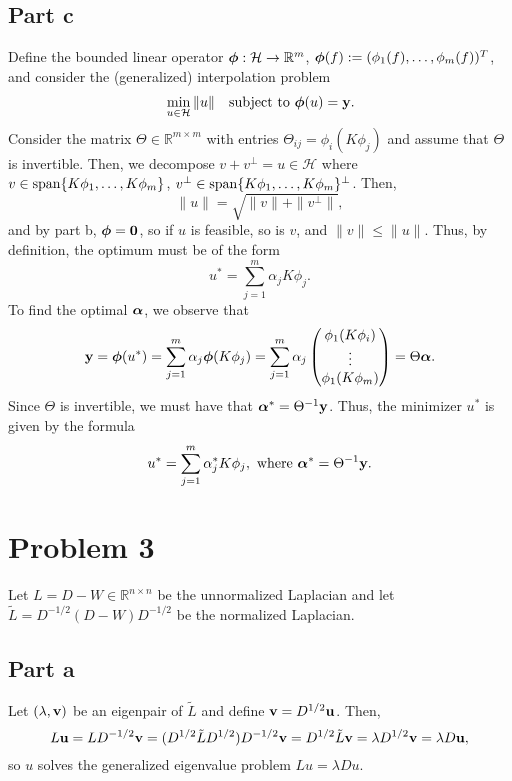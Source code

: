\documentclass{article}
\begin{document}
\subsection{Part c}
Define the bounded linear operator ${\boldsymbol{\phi}}: \mathcal{H} \rightarrow \mathbb{R}^m$, ${\boldsymbol{\phi}}(f) := (\phi_1(f), \dots, \phi_m(f))^T$, and consider the (generalized) interpolation problem
\begin{equation*}
	\begin{aligned}
		&\min_{u \in \mathcal{H}}\|u\|
		&\text{subject to } {\boldsymbol{\phi}}(u) = \mathbf{y}.
	\end{aligned}
\end{equation*}
Consider the matrix $\Theta \in \mathbb{R}^{m \times m}$ with entries $\Theta_{ij} = \phi_i(K\phi_j)$ and assume that $\Theta$ is invertible. Then, we decompose $v+v^\perp=u\in\mathcal{H}$ where $v\in\operatorname{span}\{K\phi_1, \dots, K\phi_m\}$, $v^\perp\in\operatorname{span}\{K\phi_1, \dots, K\phi_m\}^\perp$. Then, 
\[
\|u\|=\sqrt{\|v\|+\|v^\perp\|},
\]
and by part b, ${\boldsymbol{\phi}}=\mathbf{0}$, so if $u$ is feasible, so is $v$, and $\|v\|\leq\|u\|$. Thus, by definition, the optimum must be of the form
\[
u^*=\sum_{j=1}^{m}\alpha_jK\phi_j.
\]
To find the optimal ${\boldsymbol{\alpha}}$, we observe that
\[
\mathbf{y}={\boldsymbol{\phi}}(u^*)=\sum_{j=1}^{m}\alpha_j{\boldsymbol{\phi}}(K\phi_j)=\sum_{j=1}^{m}\alpha_j\begin{pmatrix}
	\phi_1(K\phi_i)\\\vdots\\\phi_1(K\phi_m)
\end{pmatrix}=\Theta{\boldsymbol{\alpha}}.
\]
Since $\Theta$ is invertible, we must have that ${\boldsymbol{\alpha}}^*=\Theta^{-1}\mathbf{y}$. Thus, the minimizer $u^\ast$ is given by the formula
\begin{equation*}
	u^\ast = \sum_{j=1}^{m} \alpha^\ast_j K\phi_j, \text{ where } \boldsymbol{\alpha}^\ast = \Theta^{-1}\mathbf{y}.
\end{equation*}

\section{Problem 3}
Let $L = D - W \in \mathbb{R}^{n \times n}$ be the unnormalized Laplacian and let $\tilde{L} = D^{-1/2}(D-W)D^{-1/2}$ be the normalized Laplacian.
\subsection{Part a}
Let $(\lambda, \mathbf{v})$ be an eigenpair of $\tilde{L}$ and define $\mathbf{v} = D^{1/2}\mathbf{u}$. Then, 
\[
L\mathbf{u}=LD^{-1/2}\mathbf{v}=(D^{1/2}\tilde LD^{1/2})D^{-1/2}\mathbf{v}=D^{1/2}\tilde L\mathbf{v}=\lambda D^{1/2}\mathbf{v}=\lambda D\mathbf{u},
\]
so $u$ solves the generalized eigenvalue problem $Lu = \lambda Du$.
\end{document}
